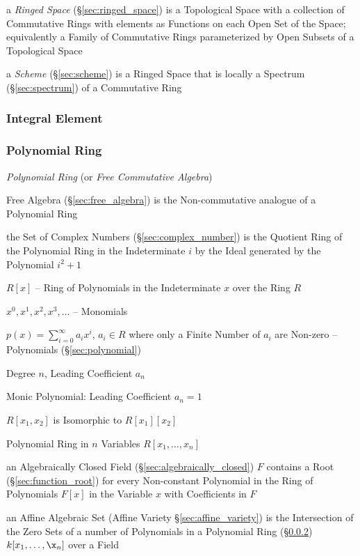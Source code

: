 \begin{itemize}
\fist a \emph{Ringed Space} (\S\ref{sec:ringed_space}) is a Topological Space
with a collection of Commutative Rings with elements as Functions on each Open
Set of the Space; equivalently a Family of Commutative Rings parameterized by
Open Subsets of a Topological Space

\fist a \emph{Scheme} (\S\ref{sec:scheme}) is a Ringed Space that is locally a
Spectrum (\S\ref{sec:spectrum}) of a Commutative Ring



\subsubsection{Integral Element}\label{sec:integral_element}

\subsubsection{Polynomial Ring}\label{sec:polynomial_ring}

\emph{Polynomial Ring} (or \emph{Free Commutative Algebra})

Free Algebra (\S\ref{sec:free_algebra}) is the Non-commutative
analogue of a Polynomial Ring

the Set of Complex Numbers (\S\ref{sec:complex_number}) is the Quotient Ring of
the Polynomial Ring in the Indeterminate $i$ by the Ideal generated by the
Polynomial $i^2 + 1$

$R[x]$ -- Ring of Polynomials in the Indeterminate $x$ over the Ring $R$

$x^0, x^1, x^2, x^3, \ldots$ -- Monomials

$p(x) = \sum_{i=0}^\infty a_i x^i$, $a_i \in R$ where only a Finite Number of
$a_i$ are Non-zero -- Polynomials (\S\ref{sec:polynomial})

Degree $n$, Leading Coefficient $a_n$

Monic Polynomial: Leading Coefficient $a_n = 1$

$R[x_1, x_2]$ is Isomorphic to $R[x_1][x_2]$

Polynomial Ring in $n$ Variables $R[x_1, \ldots, x_n]$

an Algebraically Closed Field (\S\ref{sec:algebraically_closed}) $F$ contains a
Root (\S\ref{sec:function_root}) for every Non-constant Polynomial in the Ring
of Polynomials $F[x]$ in the Variable $x$ with Coefficients in $F$

an Affine Algebraic Set (Affine Variety \S\ref{sec:affine_variety}) is the
Intersection of the Zero Sets of a number of Polynomials in a Polynomial Ring
(\S\ref{sec:polynomial_ring}) $k[x_1,\ldots,\x_n]$ over a Field


\end{itemize}
